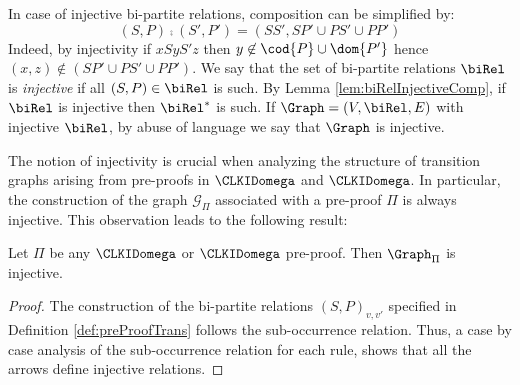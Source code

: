 In case of injective bi-partite relations, composition can be simplified by:
\[ (S,P) \comp (S',P') = (SS', SP' \cup PS' \cup PP') \]
Indeed, by injectivity if $xSyS'z$ then $y \not \in \cod{P} \cup \dom{P'}$ hence $(x,z) \not \in ( SP' \cup PS' \cup PP')$. We say that the set of bi-partite relations $\biRel$ is {\em injective} if all $(S,P) \in \biRel$ is such. By Lemma \ref{lem:biRelInjectiveComp}, if $\biRel$ is injective then $\biRel^*$ is such. If $\Graph = (V, \biRel, E)$ with injective $\biRel$, by abuse of language we say that $\Graph$ is injective.

The notion of injectivity is crucial when analyzing the structure of transition graphs arising from pre-proofs in $\CLKIDomega$ and $\CLKIDomega$. In particular, the construction of the graph $\mathcal{G}_{\Pi}$ associated with a pre-proof $\Pi$ is always injective. This observation leads to the following result:


\begin{theorem}
Let $\Pi$ be any $\CLKIDomega$ or $\CLKIDomega$ pre-proof. Then $\Graph_\Pi$ is injective.
\end{theorem}

\begin{proof}
    The construction of the bi-partite relations $(S,P)_{v,v'}$ specified in Definition \ref{def:preProofTrans} follows the sub-occurrence relation. Thus, a case by case analysis of the sub-occurrence relation for each rule, shows that all the arrows define injective relations.
\end{proof}


